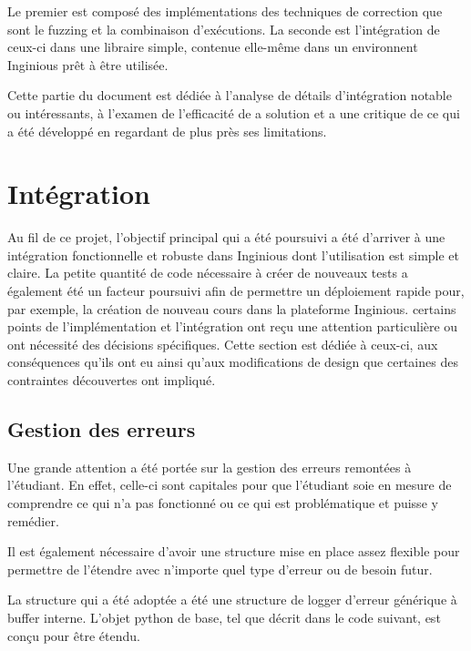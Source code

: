 \documentclass[a4paper]{report}
\begin{document}
Le premier est composé des implémentations des techniques de correction que sont le fuzzing et la combinaison d'exécutions.
La seconde est l'intégration de ceux-ci dans une libraire simple, contenue elle-même dans un environnent Inginious prêt à être utilisée.

Cette partie du document est dédiée à l'analyse de détails d'intégration notable ou intéressants, à l'examen de l'efficacité de a solution et a une critique de ce qui a été développé en regardant de plus près ses limitations.



\section{Intégration}
Au fil de ce projet, l'objectif principal qui a été poursuivi a été d'arriver à une intégration fonctionnelle et robuste dans Inginious dont l'utilisation est simple et claire.
La petite quantité de code nécessaire à créer  de nouveaux tests a également été un facteur poursuivi afin de permettre un déploiement rapide pour, par exemple, la création de nouveau cours dans la plateforme Inginious.
certains points de l'implémentation et l'intégration ont reçu une attention particulière ou ont nécessité des décisions spécifiques.
Cette section est dédiée à ceux-ci, aux conséquences qu'ils ont eu ainsi qu'aux modifications de design que certaines des contraintes découvertes ont impliqué.

\subsection{Gestion des erreurs}
Une grande attention a été portée sur la gestion des erreurs remontées à l'étudiant.
En effet, celle-ci sont capitales pour que l'étudiant soie en mesure de comprendre ce qui n'a pas fonctionné ou ce qui est problématique et puisse y remédier.

Il est également nécessaire d'avoir une structure mise en place assez flexible pour permettre de l'étendre avec n'importe quel type d'erreur ou de besoin futur.

La structure qui a été adoptée a été une structure de logger d'erreur générique à buffer interne.
L'objet python de base, tel que décrit dans le code suivant, est conçu pour être étendu.
\end{document}
